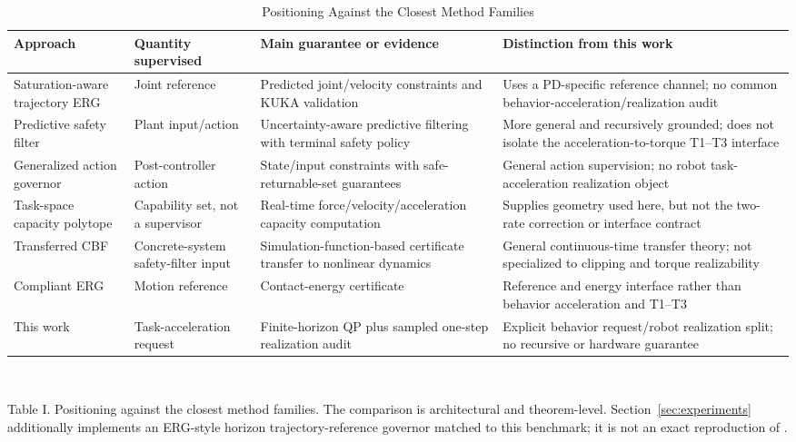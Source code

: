 \documentclass[journal]{IEEEtran}
\begin{document}
\begin{table}[t]
\caption{Positioning Against the Closest Method Families}
\label{tab:positioning}
\centering
\footnotesize
\setlength{\tabcolsep}{4pt}
\begin{tabular}{@{}p{3.0cm}p{2.6cm}p{4.6cm}p{5.6cm}@{}}
\toprule
Approach & Quantity supervised & Main guarantee or evidence & Distinction from this work \\
\midrule
Saturation-aware trajectory ERG \cite{r17} & Joint reference & Predicted joint/velocity constraints and KUKA validation & Uses a PD-specific reference channel; no common behavior-acceleration/realization audit \\
Predictive safety filter \cite{r16} & Plant input/action & Uncertainty-aware predictive filtering with terminal safety policy & More general and recursively grounded; does not isolate the acceleration-to-torque T1--T3 interface \\
Generalized action governor \cite{r18} & Post-controller action & State/input constraints with safe-returnable-set guarantees & General action supervision; no robot task-acceleration realization object \\
Task-space capacity polytope \cite{r20} & Capability set, not a supervisor & Real-time force/velocity/acceleration capacity computation & Supplies geometry used here, but not the two-rate correction or interface contract \\
Transferred CBF \cite{r19} & Concrete-system safety-filter input & Simulation-function-based certificate transfer to nonlinear dynamics & General continuous-time transfer theory; not specialized to clipping and torque realizability \\
Compliant ERG \cite{r21} & Motion reference & Contact-energy certificate & Reference and energy interface rather than behavior acceleration and T1--T3 \\
This work & Task-acceleration request & Finite-horizon QP plus sampled one-step realization audit & Explicit behavior request/robot realization split; no recursive or hardware guarantee \\
\bottomrule
\end{tabular}
\\[2pt]
\raggedright\footnotesize Table I. Positioning against the closest method families. The comparison is architectural and theorem-level. Section~\ref{sec:experiments} additionally implements an ERG-style horizon trajectory-reference governor matched to this benchmark; it is not an exact reproduction of \cite{r17}.
\end{table}
\end{document}
